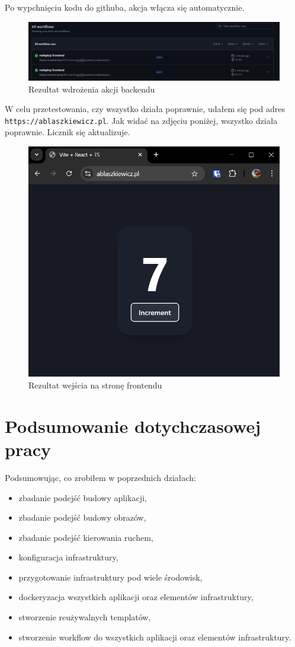 \documentclass{article}
\begin{document}
Po wypchnięciu kodu do githuba, akcja włącza się automatycznie.

\begin{figure}[H]
    \centering
    \includegraphics[width=1\linewidth]{rezultatPierwszejAkcjiFrontend.png}
    \caption{Rezultat wdrożenia akcji backendu}
    \label{fig:enter-label}
\end{figure}

W celu przetestowania, czy wszystko działa poprawnie, udałem się pod adres \lstinline|https://ablaszkiewicz.pl|. Jak widać na zdjęciu poniżej, wszystko działa poprawnie. Licznik się aktualizuje.

\begin{figure}[H]
    \centering
    \includegraphics[width=0.5\linewidth]{rezultatWejsciaNaFrontend.png}
    \caption{Rezultat wejścia na stronę frontendu}
    \label{fig:enter-label}
\end{figure}

\section{Podsumowanie dotychczasowej pracy}

Podsumowując, co zrobiłem w poprzednich działach:
\begin{itemize}
    \item zbadanie podejść budowy aplikacji,
    \item zbadanie podejść budowy obrazów,
    \item zbadanie podejść kierowania ruchem,
    \item konfiguracja infrastruktury,
    \item przygotowanie infrastruktury pod wiele środowisk,
    \item dockeryzacja wszystkich aplikacji oraz elementów infrastruktury,
    \item stworzenie reużywalnych templatów,
    \item stworzenie workflow do wszystkich aplikacji oraz elementów infrastruktury.
\end{itemize}
\end{document}
